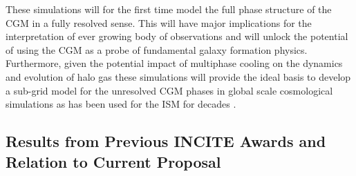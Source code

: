 \documentclass[11pt,letterpaper,english]{article}
\begin{document}
These simulations will for the first time model the full phase structure of the CGM in a fully resolved sense. This will have major implications for the interpretation of ever growing body of observations and will unlock the potential of using the CGM as a probe of fundamental galaxy formation physics. Furthermore, given the potential impact of multiphase cooling on the dynamics and evolution of halo gas these simulations will provide the ideal basis to develop a sub-grid model for the unresolved CGM phases in global scale cosmological simulations as has been used for the ISM for decades \cite{SpringelHernquist}.







\vspace{-.25in}
\subsection{Results from Previous INCITE Awards and Relation to Current Proposal}
\vspace{-.2in}
\end{document}
